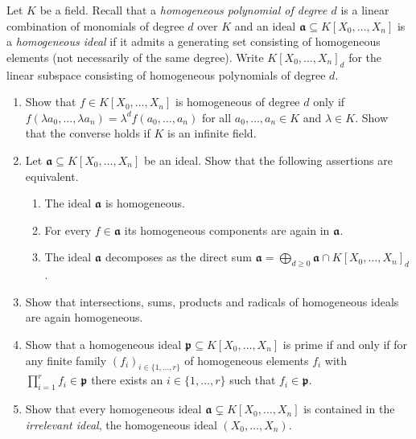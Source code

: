 \documentclass{exercises}
\begin{document}
\begin{exercise}
  Let $K$ be a field.
  Recall that a \emph{homogeneous polynomial of degree $d$} is a linear combination of monomials of degree $d$ over $K$ and an ideal $𝖆⊆K[X_0,\dots,X_n]$ is a \emph{homogeneous ideal} if it admits a generating set consisting of homogeneous elements (not necessarily of the same degree).
  Write $K[X_0,\dots,X_n]_d$ for the linear subspace consisting of homogeneous polynomials of degree $d$.
  \begin{enumerate}
    \item Show that $f ∈ K[X_0,\dots,X_n]$ is homogeneous of degree $d$ only if $f(λa_0,\dots,λa_n) = λ^d f(a_0,\dots,a_n)$ for all $a_0,\dots,a_n ∈ K$ and $λ ∈ K$.
      Show that the converse holds if $K$ is an infinite field.
    \item Let $𝖆⊆K[X_0,\dots,X_n]$ be an ideal.
      Show that the following assertions are equivalent.
      \begin{enumerate}
        \item The ideal $𝖆$ is homogeneous.
        \item For every $f∈𝖆$ its homogeneous components are again in $𝖆$.
        \item The ideal $𝖆$ decomposes as the direct sum $𝖆 = \bigoplus_{d≥0}𝖆 ∩ K[X_0,\dots,X_n]_d$.
      \end{enumerate}
    \item Show that intersections, sums, products and radicals of homogeneous ideals are again homogeneous.
    \item Show that a homogeneous ideal $𝖕⊆K[X_0,\dots,X_n]$ is prime if and only if for any finite family $(f_i)_{i∈\{1,\dots,r\}}$ of homogeneous elements $f_i$ with $∏_{i=1}^r f_i ∈ 𝖕$ there exists an $i ∈ \{1,\dots,r\}$ such that $f_i ∈ 𝖕$.
    \item Show that every homogeneous ideal $𝖆 ⊊ K[X_0,\dots,X_n]$ is contained in the \emph{irrelevant ideal}, the homogeneous ideal $(X_0,\dots,X_n)$.
  \end{enumerate}
\end{exercise}
\end{document}
